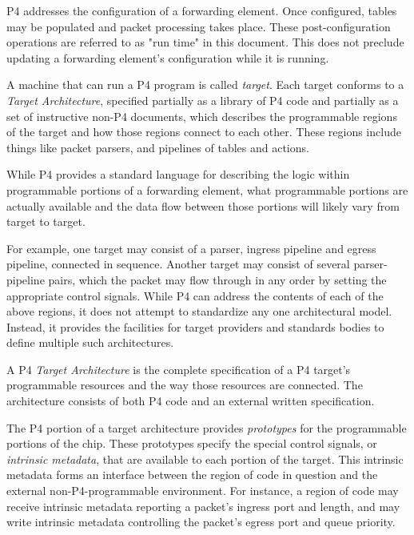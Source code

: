 \documentclass[12pt]{article}
\begin{document}
P4 addresses the configuration of a forwarding element. Once configured, tables 
may be populated and packet processing takes place. These post-configuration 
operations are referred to as "run time" in this document. This does not preclude 
updating a forwarding element's configuration while it is running.

A machine that can run a P4 program is called \textit{target}. Each target
conforms to a \textit{Target Architecture}, specified partially as a library of
P4 code and partially as a set of instructive non-P4 documents, which describes
the programmable regions of the target and how those regions connect to each
other. These regions include things like packet parsers, and pipelines of tables
and actions.


While P4 provides a standard language for describing the logic within
programmable portions of a forwarding element, what programmable portions are
actually available and the data flow between those portions will likely vary
from target to target.

For example, one target may consist of a parser, ingress \matchaction pipeline
and egress \matchaction pipeline, connected in sequence. Another target may
consist of several parser-pipeline pairs, which the packet may flow through
in any order by setting the appropriate control signals. While P4 can address
the contents of each of the above regions, it does not attempt to standardize
any one architectural model. Instead, it provides the facilities for target
providers and standards bodies to define multiple such architectures.

A P4 \textit{Target Architecture} is the complete specification of a P4
target's programmable resources and the way those resources are connected. The
architecture consists of both P4 code and an external written specification.


The P4 portion of a target architecture provides \textit{prototypes} for the
programmable portions of the chip. These prototypes specify the special control
signals, or \textit{intrinsic metadata}, that are available to each portion of
the target. This intrinsic metadata forms an interface between the region of
code in question and the external non-P4-programmable environment. For instance,
a region of code may receive intrinsic metadata reporting a packet's ingress
port and length, and may write intrinsic metadata controlling the packet's
egress port and queue priority.
\end{document}

